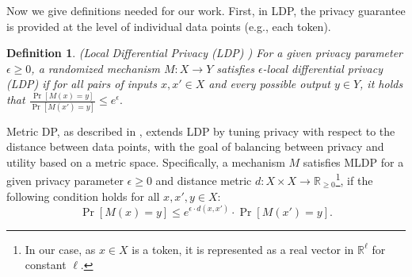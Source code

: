 \documentclass[11pt]{article}
\newcommand{\real}{\mathbb{R}}
\newtheorem{definition}{Definition}
\begin{document}
Now we give definitions needed for our work. First, in LDP, the privacy guarantee is provided at the level of individual data points (e.g., each token). %



\begin{definition}(Local Differential Privacy (LDP) \cite{duchi2013local})
For a given privacy parameter \(\epsilon \geq 0\), a randomized mechanism \(M : X \rightarrow Y\) satisfies \(\epsilon\)-local differential privacy (LDP) if for all pairs of inputs \(x, x' \in X\) and every possible output \(y \in Y\), it holds that
\(
\frac{\Pr[M(x) = y]}{\Pr[M(x') = y]} \leq e^{\epsilon}.
\)


\end{definition}


Metric DP, as described in \cite{alvim2018local}, extends LDP by tuning privacy with respect to the distance between data points, with the goal of balancing between privacy and utility based on a metric space. 
Specifically, a mechanism \(M\) satisfies MLDP for a given privacy parameter \(\epsilon \geq 0\) and distance metric \(d : X \times X \rightarrow \mathbb{R}_{\geq 0}\)\footnote{In our case, as $x\in X$ is a token, it is represented as a real vector in $\real^\ell$ for constant $\ell$.}, if the following condition holds for all \(x, x', y \in X\):
$$
\Pr[M(x) = y] \leq e^{\epsilon \cdot d(x, x')} \cdot \Pr[M(x') = y].
$$


\end{document}
